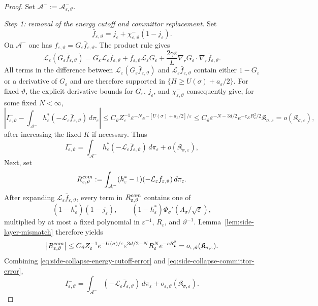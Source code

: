 \documentclass[10pt,a4paper]{amsart}
\newcommand{\calL}{\mathcal L}
\newcommand{\eps}{\varepsilon}
\begin{document}
\begin{proof}
Set $\mathcal A^-:=\mathcal A_{\eps,\vartheta}^-$.

\emph{Step 1: removal of the energy cutoff and committor replacement.}
Set
\[
\bar f_{\eps,\vartheta}
=j_\eps+\chi_{\eps,\vartheta}^-(1-j_\eps).
\]
On $\mathcal A^-$ one has $f_{\eps,\vartheta}=G_\eps\bar f_{\eps,\vartheta}$.
The product rule gives
\[
\calL_\eps(G_\eps\bar f_{\eps,\vartheta})
=G_\eps\calL_\eps\bar f_{\eps,\vartheta}
+\bar f_{\eps,\vartheta}\calL_\eps G_\eps
+\frac{2\gamma\eps}{L}
\nabla_rG_\eps\cdot\nabla_r\bar f_{\eps,\vartheta}.
\]
All terms in the difference between
$\calL_\eps(G_\eps\bar f_{\eps,\vartheta})$ and
$\calL_\eps\bar f_{\eps,\vartheta}$ contain either $1-G_\eps$ or a derivative
of $G_\eps$ and are therefore supported in
$\{H\ge U(\sigma)+a_\eps/2\}$.  For fixed $\vartheta$, the explicit derivative
bounds for $G_\eps$, $j_\eps$, and $\chi_{\eps,\vartheta}^-$ consequently give, for some
fixed $N<\infty$,
\[
\left|I^-_{\eps,\vartheta}
-\int_{\mathcal A^-}h_\eps^*
(-\calL_\eps\bar f_{\eps,\vartheta})\,d\pi_\eps\right|
\le
C_\vartheta Z_\eps^{-1}\eps^{-N}
e^{-[U(\sigma)+a_\eps/2]/\eps}
\le C_\vartheta\eps^{-N-3d/2}e^{-c_KR_\eps^2/2}
\mathfrak K_{\sigma,\eps}
=o(\mathfrak K_{\sigma,\eps}),
\]
after increasing the fixed $K$ if necessary.  Thus
\begin{equation}
\label{eq:side-collapse-energy-cutoff-error}
I^-_{\eps,\vartheta}
=\int_{\mathcal A^-}h_\eps^*(-\calL_\eps \bar f_{\eps,\vartheta})\,d\pi_\eps
+o(\mathfrak K_{\sigma,\eps}),
\end{equation}
Next, set
\[
R^{\rm com}_{\eps,\vartheta}
:=\int_{\mathcal A^-}(h_\eps^*-1)
(-\calL_\eps\bar f_{\eps,\vartheta})\,d\pi_\eps.
\]
After expanding $\calL_\eps\bar f_{\eps,\vartheta}$, every term in
$R^{\rm com}_{\eps,\vartheta}$ contains one of
\[
(1-h_\eps^*)(1-j_\eps),
\qquad
(1-h_\eps^*)\Phi_\sigma'(\Lambda_\sigma/\sqrt\eps),
\]
multiplied by at most a fixed polynomial in
$\eps^{-1}$, $R_\eps$, and $\vartheta^{-1}$.
Lemma~\ref{lem:side-layer-mismatch} therefore yields
\begin{equation}
\label{eq:side-collapse-committor-error}
\left|R^{\rm com}_{\eps,\vartheta}\right|
\le
C_\vartheta Z_\eps^{-1}e^{-U(\sigma)/\eps}
\eps^{3d/2-N}R_\eps^N e^{-cR_\eps^2}
=o_{\eps,\vartheta}(\mathfrak K_{\sigma,\eps}).
\end{equation}
Combining \eqref{eq:side-collapse-energy-cutoff-error} and
\eqref{eq:side-collapse-committor-error},
\begin{equation}
\label{eq:side-collapse-component-replacement}
I^-_{\eps,\vartheta}
=\int_{\mathcal A^-}(-\calL_\eps\bar f_{\eps,\vartheta})\,d\pi_\eps
+o_{\eps,\vartheta}(\mathfrak K_{\sigma,\eps}).
\end{equation}


\end{proof}
\end{document}
